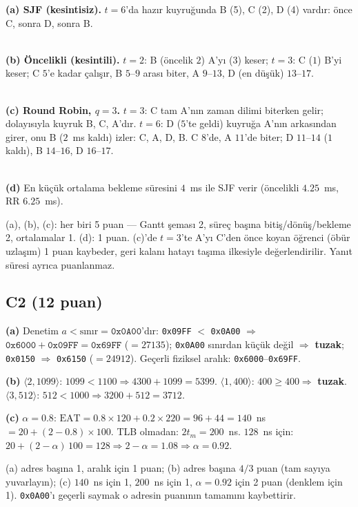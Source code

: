 \documentclass[11pt,a4paper]{article}
\begin{document}
\textbf{(a) SJF (kesintisiz).} $t=6$'da hazır kuyruğunda B (5), C (2), D (4) vardır: önce C, sonra D, sonra B.\\[0.2em]
\\[0.3em]
{\small{}}

\textbf{(b) Öncelikli (kesintili).} $t=2$: B (öncelik $2$) A'yı ($3$) keser; $t=3$: C ($1$) B'yi keser; C $5$'e kadar çalışır, B $5$--$9$ arası biter, A $9$--$13$, D (en düşük) $13$--$17$.\\[0.2em]
\\[0.3em]
{\small{}}

\textbf{(c) Round Robin, $q = 3$.} $t=3$: C tam A'nın zaman dilimi biterken gelir; dolayısıyla kuyruk B, C, A'dır. $t=6$: D ($5$'te geldi) kuyruğa A'nın arkasından girer, onu B ($2$~ms kaldı) izler: C, A, D, B. C $8$'de, A $11$'de biter; D $11$--$14$ ($1$ kaldı), B $14$--$16$, D $16$--$17$.\\[0.2em]
\\[0.3em]
{\small{}}

\textbf{(d)} En küçük ortalama bekleme süresini $4$~ms ile SJF verir (öncelikli $4.25$~ms, RR $6.25$~ms).
\begin{rubric}(a), (b), (c): her biri 5 puan --- Gantt şeması 2, süreç başına bitiş/dönüş/bekleme 2, ortalamalar 1. (d): 1 puan. (c)'de $t=3$'te A'yı C'den önce koyan öğrenci (öbür uzlaşım) 1 puan kaybeder, geri kalanı hatayı taşıma ilkesiyle değerlendirilir. Yanıt süresi ayrıca puanlanmaz.\end{rubric}

\subsection*{C2 (12 puan)}
\textbf{(a)} Denetim $a < \text{sınır} = \texttt{0x0A00}$'dır:
\texttt{0x09FF} $<$ \texttt{0x0A00} $\Rightarrow$ $\texttt{0x6000} + \texttt{0x09FF} = \texttt{0x69FF}$ ($= 27135$);
\texttt{0x0A00} sınırdan küçük değil $\Rightarrow$ \textbf{tuzak};
\texttt{0x0150} $\Rightarrow$ \texttt{0x6150} ($= 24912$).
Geçerli fiziksel aralık: \texttt{0x6000}--\texttt{0x69FF}.

\textbf{(b)} $\langle 2, 1099\rangle$: $1099 < 1100 \Rightarrow 4300 + 1099 = 5399$. \quad $\langle 1, 400\rangle$: $400 \ge 400 \Rightarrow$ \textbf{tuzak}. \quad $\langle 3, 512\rangle$: $512 < 1000 \Rightarrow 3200 + 512 = 3712$.

\textbf{(c)} $\alpha = 0.8$: $\text{EAT} = 0.8 \times 120 + 0.2 \times 220 = 96 + 44 = 140$~ns $= 20 + (2 - 0.8)\times 100$. TLB olmadan: $2t_m = 200$~ns. $128$~ns için: $20 + (2-\alpha)\,100 = 128 \Rightarrow 2 - \alpha = 1.08 \Rightarrow \alpha = 0.92$.
\begin{rubric}(a) adres başına 1, aralık için 1 puan; (b) adres başına $4/3$ puan (tam sayıya yuvarlayın); (c) $140$~ns için 1, $200$~ns için 1, $\alpha = 0.92$ için 2 puan (denklem için 1). \texttt{0x0A00}'ı geçerli saymak o adresin puanının tamamını kaybettirir.\end{rubric}
\end{document}
